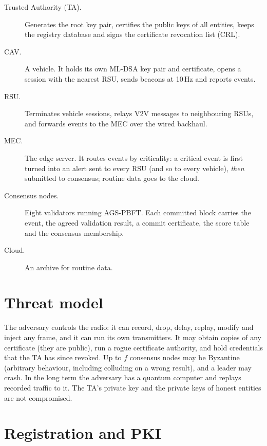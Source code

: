 \begin{description}
\item[Trusted Authority (TA).] Generates the root key pair, certifies the
public keys of all entities, keeps the registry database and signs the
certificate revocation list (CRL).
\item[CAV.] A vehicle. It holds its own ML-DSA key pair and certificate,
opens a session with the nearest RSU, sends beacons at 10\,Hz and reports
events.
\item[RSU.] Terminates vehicle sessions, relays V2V messages to neighbouring
RSUs, and forwards events to the MEC over the wired backhaul.
\item[MEC.] The edge server. It routes events by criticality: a critical
event is first turned into an alert sent to every RSU (and so to every
vehicle), \emph{then} submitted to consensus; routine data goes to the cloud.
\item[Consensus nodes.] Eight validators running AGS-PBFT. Each committed
block carries the event, the agreed validation result, a commit certificate,
the score table and the consensus membership.
\item[Cloud.] An archive for routine data.
\end{description}

\section{Threat model}

The adversary controls the radio: it can record, drop, delay, replay, modify
and inject any frame, and it can run its own transmitters. It may obtain copies
of any certificate (they are public), run a rogue certificate authority, and
hold credentials that the TA has since revoked. Up to $f$ consensus nodes may
be Byzantine (arbitrary behaviour, including colluding on a wrong result), and
a leader may crash. In the long term the adversary has a quantum computer and
replays recorded traffic to it. The TA's private key and the private keys of
honest entities are not compromised.

\section{Registration and PKI}

